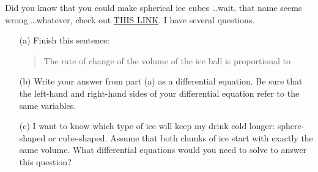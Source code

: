 \begin{problem}\label{prob:ice_balls}
    Did you know that you could make spherical ice cubes \ldots wait, that name seems
    wrong \ldots whatever, check out
    \href{https://www.amazon.com/Tovolo-Sphere-Ice-Molds-Set/dp/B007ACTN54}{THIS LINK}.
    I have several questions.
    \begin{enumerate}
        \item[(a)] Finish this sentence: 
            \begin{quote}
                The rate of change of the volume of the ice ball is proportional to
                \underline{\hspace{1in}}
            \end{quote}
        \item[(b)] Write your answer from part (a) as a differential equation.  Be sure
            that the left-hand and right-hand sides of your differential equation refer to
            the same variables.
        \item[(c)] I want to know which type of ice will keep my drink cold longer:
            sphere-shaped or cube-shaped.  Assume that both chunks of ice start with
            exactly the same volume.  What differential equations would you need to solve
            to answer this question?
    \end{enumerate}
\end{problem}

